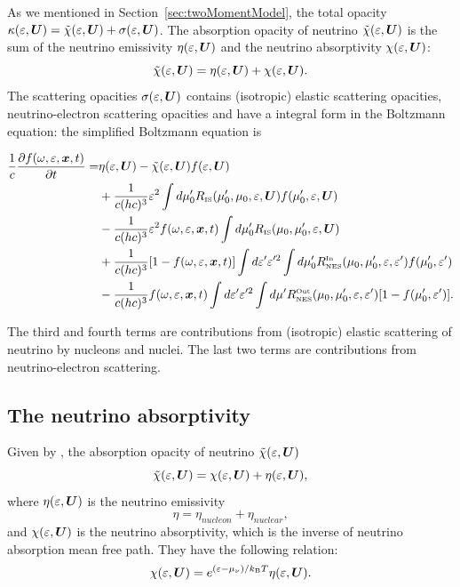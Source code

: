 \documentclass[10pt,preprint]{aastex}
\newcommand{\NES}{\mbox{\tiny NES}}
\begin{document}
As we mentioned in Section~\ref{sec:twoMomentModel}, the total opacity $\kappa(\varepsilon,\boldsymbol{U})=\tilde{\chi}(\varepsilon,\boldsymbol{U})+\sigma(\varepsilon,\boldsymbol{U})$.
The absorption opacity of neutrino $\tilde{\chi}(\varepsilon,\boldsymbol{U})$ is the sum of the neutrino emissivity $\eta(\varepsilon,\boldsymbol{U}) $ and the neutrino absorptivity  $ \chi(\varepsilon,\boldsymbol{U})$:
\begin{equation}
  \tilde{\chi}(\varepsilon,\boldsymbol{U}) = \eta(\varepsilon,\boldsymbol{U}) + \chi(\varepsilon,\boldsymbol{U}). 
\end{equation}
 The scattering opacities $\sigma(\varepsilon,\boldsymbol{U})$ contains (isotropic) elastic scattering opacities, neutrino-electron scattering opacities and have a integral form in the Boltzmann equation: the simplified Boltzmann equation is

 
\begin{align}
\dfrac{1}{c}\dfrac{\partial f(\omegaNu,\epsilonNu,\bx,t)}{\partial t} = 
&  \eta(\epsilonNu,\bU) - \tilde{\chi}(\epsilonNu,\bU)f(\epsilonNu,\bU) \nonumber \\
& + \dfrac{1}{c(hc)^3} \epsilonNu^2 \int d\mu^\prime_0 R_{\IS}( \mu^\prime_0, \mu_0,\epsilonNu, \bU) f(\mu^\prime_0, \epsilonNu,\bU) \nonumber \\
& - \dfrac{1}{c(hc)^3} \epsilonNu^2 f(\omegaNu,\epsilonNu,\bx,t)\int d\mu^\prime_0 R_{\IS}(\mu_0, \mu^\prime_0, \epsilonNu,\bU) \nonumber \\
& + \dfrac{1}{c(hc)^3} [1- f(\omegaNu,\epsilonNu,\bx,t)] \int d\epsilonNu^{\prime} \epsilonNu^{\prime 2} \int d\mu^\prime_0 R^{\In}_{\NES} (\mu_0,\mu^\prime_0,\epsilonNu,\epsilonNu^{\prime} )f(\mu^\prime_0,\epsilonNu^{\prime} ) \nonumber \\
& - \dfrac{1}{c(hc)^3} f(\omegaNu,\epsilonNu,\bx,t) \int d\epsilonNu^{\prime} \epsilonNu^{\prime 2} \int d\mu^\prime R^{\Out}_{\NES} (\mu_0,\mu^\prime_0,\epsilonNu,\epsilonNu^{\prime} ) [1-f(\mu^\prime_0,\epsilonNu^{\prime} )].
\end{align}

The third and fourth terms are contributions from (isotropic) elastic scattering of neutrino by nucleons and nuclei. The last two terms are contributions from neutrino-electron scattering.

\subsection{The neutrino absorptivity}

Given by \citet{bruenn_1985}, the absorption opacity of neutrino $\tilde{\chi}(\varepsilon,\boldsymbol{U})$ 
\begin{equation}
\tilde{\chi}(\varepsilon,\boldsymbol{U}) = \chi(\varepsilon,\boldsymbol{U}) + \eta(\varepsilon,\boldsymbol{U}), 
\end{equation}
where $\eta(\varepsilon,\boldsymbol{U}) $ is the neutrino emissivity
\begin{equation}
\eta = \eta_{nucleon} + \eta_{nuclear},
\end{equation}  
and $ \chi(\varepsilon,\boldsymbol{U})$ is the neutrino absorptivity, which is the inverse of neutrino absorption mean free path.
They have the following relation:
\begin{equation}
\chi(\varepsilon,\boldsymbol{U}) = e^{(\varepsilon-\mu_{\nu})/k_{\mbox{\tiny B}}T} \eta(\varepsilon,\boldsymbol{U}). 
\end{equation}
\end{document}
